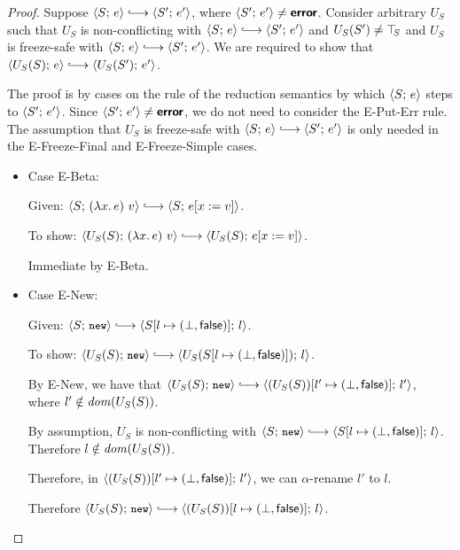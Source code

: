 \begin{proof}
  Suppose $\config{S}{e} \parstepsto \config{S'}{e'}$, where
  $\langle S';\, e' \rangle \neq \textbf{\textsf{error}}$.  Consider arbitrary $U_S$ such that
  $U_S$ is non-conflicting with $\config{S}{e} \parstepsto
  \config{S'}{e'}$ and $U_S(S') \neq \top\hspace{-0.85mm}_{S}$ and $U_S$ is freeze-safe
  with $\config{S}{e} \parstepsto \config{S'}{e'}$.  We are required
  to show that $\config{U_S(S)}{e} \parstepsto \config{U_S(S')}{e'}$.

  The proof is by cases on the rule of the reduction semantics by
  which $\langle S;\, e \rangle$ steps to $\langle S';\, e' \rangle$.  Since
  $\langle S';\, e' \rangle \neq \textbf{\textsf{error}}$, we do not need to consider the {\sc
    E-Put-Err} rule.  The assumption that $U_S$ is freeze-safe with
  $\config{S}{e} \parstepsto \config{S'}{e'}$ is only needed in the
  {\sc E-Freeze-Final} and {\sc E-Freeze-Simple} cases.

  \begin{itemize}

    \item Case {\sc E-Beta}:

      Given: $\config{S}{\app{(\lam{x}{e})}{v}} \parstepsto
      \config{S}{\subst{e}{x}{v}}$.

      To show: $\config{U_S(S)}{\app{(\lam{x}{e})}{v}} \parstepsto
      \config{U_S(S)}{\subst{e}{x}{v}}$.

      Immediate by {\sc E-Beta}.

    \item Case {\sc E-New}:

      Given: $\config{S}{\NEW} \parstepsto
      \config{\extS{S}{l}{\bot}{\frozenfalse}}{l}$.

      To show: $\config{U_S(S)}{\NEW} \parstepsto
      \config{U_S(\extS{S}{l}{\bot}{\frozenfalse})}{l}$.

      By {\sc E-New}, we have that $\config{U_S(S)}{\NEW} \parstepsto
      \config{\extS{(U_S(S))}{l'}{\bot}{\frozenfalse}}{l'}$, \\ where $l'
      \notin \mathit{dom}(U_S(S))$.

      By assumption, $U_S$ is non-conflicting with $\config{S}{\NEW}
      \parstepsto \config{\extS{S}{l}{\bot}{\frozenfalse}}{l}$.
      Therefore $l \notin \mathit{dom}(U_S(S))$.

      Therefore, in
      $\langle (U_S(S))[l' \mapsto (\bot, \textsf{false})];\, l' \rangle$, we
      can $\alpha$-rename $l'$ to $l$.

      Therefore $\config{U_S(S)}{\NEW} \parstepsto
      \config{\extS{(U_S(S))}{l}{\bot}{\frozenfalse}}{l}$.


\end{itemize}
\end{proof}
